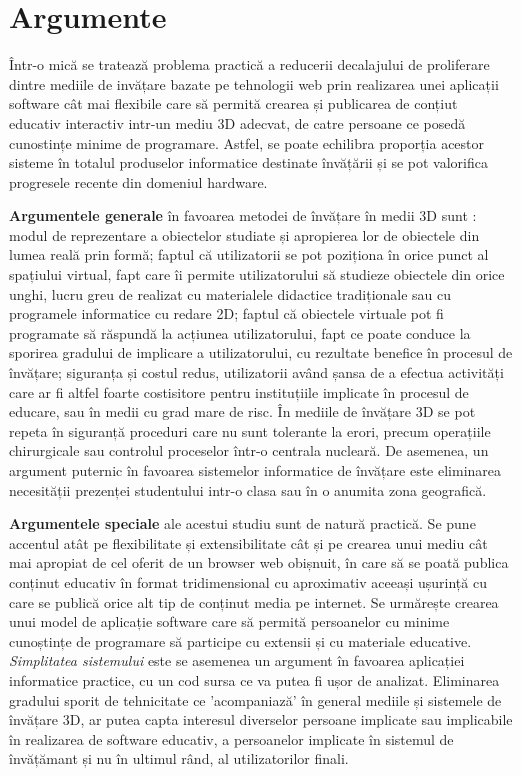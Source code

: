 \section{Argumente}
\par Într-o mică se tratează problema practică a reducerii decalajului de proliferare dintre mediile de invățare bazate pe tehnologii web prin realizarea unei aplicații software cât mai flexibile care să permită crearea și publicarea de conțiut educativ interactiv intr-un mediu 3D adecvat, de catre persoane ce posedă cunostințe minime de programare. Astfel, se poate echilibra proporția acestor sisteme în totalul produselor informatice destinate învățării și se pot valorifica progresele recente din domeniul hardware.
\par \textbf{Argumentele generale} în favoarea metodei de învățare în medii 3D sunt : modul de reprezentare a obiectelor studiate și apropierea lor de obiectele din lumea reală prin formă; faptul că utilizatorii se pot poziționa în orice punct al spațiului virtual, fapt care îi permite utilizatorului să studieze obiectele din orice unghi, lucru greu de realizat cu materialele didactice tradiționale sau cu programele informatice cu redare 2D; faptul că obiectele virtuale pot fi programate să răspundă la acțiunea utilizatorului, fapt ce poate conduce la sporirea gradului de implicare a utilizatorului, cu rezultate benefice în procesul de învățare; siguranța și costul redus, utilizatorii având șansa de a efectua activități care ar fi altfel foarte costisitore pentru instituțiile implicate în procesul de educare, sau în medii cu grad mare de risc. În mediile de învățare 3D se pot repeta în siguranță proceduri care nu sunt tolerante la erori, precum operațiile chirurgicale sau controlul proceselor într-o centrala nucleară. De asemenea, un argument puternic în favoarea sistemelor informatice de învățare este eliminarea necesității prezenței studentului intr-o clasa sau în o anumita zona geografică.
\par \textbf{Argumentele speciale} ale acestui studiu sunt de natură practică. Se pune accentul atât pe flexibilitate și extensibilitate cât și pe crearea unui mediu cât mai apropiat de cel oferit de un browser web obișnuit, în care să se poată publica conținut educativ în format tridimensional cu aproximativ aceeași ușurință cu care se publică orice alt tip de conținut media pe internet. Se urmărește crearea unui model de aplicație software care să permită persoanelor cu minime cunoștințe de programare să participe cu extensii și cu materiale educative.
\textit{Simplitatea sistemului} este se asemenea un argument în favoarea aplicației informatice practice, cu un cod sursa ce va putea fi ușor de analizat. 	Eliminarea gradului sporit de tehnicitate ce 'acompaniază' în general mediile și sistemele de învățare 3D, ar putea capta interesul diverselor persoane implicate sau implicabile în realizarea de software educativ, a persoanelor implicate în sistemul de învățămant și nu în ultimul rând, al utilizatorilor finali.

